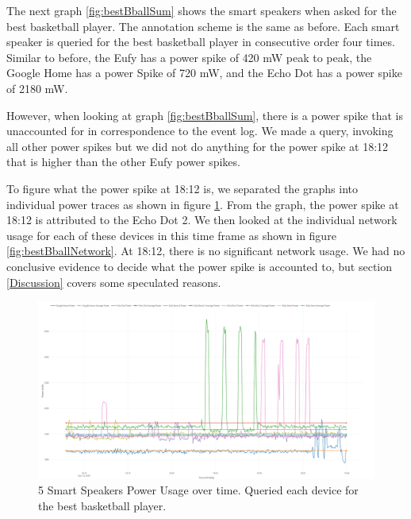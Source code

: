The next graph \ref{fig:bestBballSum} shows the smart speakers when asked for the best basketball player. The annotation scheme is the same as before. Each smart speaker is queried for the best basketball player in consecutive order four times. Similar to before, the Eufy has a power spike of 420 mW peak to peak, the Google Home has a power Spike of 720 mW, and the Echo Dot has a power spike of 2180 mW.

However, when looking at graph \ref{fig:bestBballSum}, there is a power spike that is unaccounted for in correspondence to the event log. We made a query, invoking all other power spikes but we did not do anything for the power spike at 18:12 that is higher than the other Eufy power spikes.

To figure what the power spike at 18:12 is, we separated the graphs into individual power traces as shown in figure \ref{fig:bestBballSeperate}. From the graph, the power spike at 18:12 is attributed to the Echo Dot 2. We then looked at the individual network usage for each of these devices in this time frame as shown in figure \ref{fig:bestBballNetwork}. At 18:12, there is no significant network usage. We had no conclusive evidence to decide what the power spike is accounted to, but section \ref{Discussion} covers some speculated reasons.

\begin{figure}[H]
  \centering
  \includegraphics[width=1\textwidth]{figures/bestBballSeperate.png}
  \caption{5 Smart Speakers Power Usage over time. Queried each device for the
  best basketball player.}
  \label{fig:bestBballSeperate}
\end{figure}

